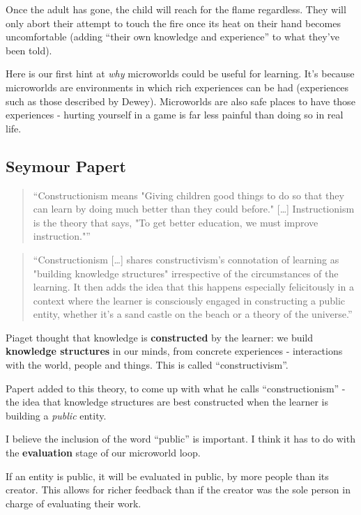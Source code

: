 Once the adult has gone, the child will reach for the flame regardless.
They will only abort their attempt to touch the fire once its heat on
their hand becomes uncomfortable (adding ``their own knowledge and experience'' to what they've been told).

Here is our first hint at \emph{why} microworlds could be useful for
learning. It's because microworlds are environments in which rich
experiences can be had (experiences such as those described by Dewey).
Microworlds are also safe places to have those experiences - hurting
yourself in a game is far less painful than doing so in real life.

\subsection{Seymour Papert}

\begin{quote}
``Constructionism means "Giving children good things to do so that they
can learn by doing much better than they could before." {[}\ldots{}{]}
Instructionism is the theory that says, "To get better education, we
must improve instruction."''\cite{convsinst}
\end{quote}

\begin{quote}
``Constructionism {[}\ldots{}{]} shares constructivism's connotation of
learning as "building knowledge structures" irrespective of the
circumstances of the learning. It then adds the idea that this happens
especially felicitously in a context where the learner is consciously
engaged in constructing a public entity, whether it's a sand castle on
the beach or a theory of the universe.''\cite{sitconst}
\end{quote}

Piaget thought that knowledge is \textbf{constructed} by the learner: we
build \textbf{knowledge structures} in our minds, from concrete
experiences - interactions with the world, people and things. This is called ``constructivism''.

Papert added to this theory, to come up with what he calls
``constructionism'' - the idea that knowledge structures are best
constructed when the learner is building a \emph{public} entity.

I believe the inclusion of the word ``public'' is important. I think it
has to do with the \textbf{evaluation} stage of our microworld loop.

If an entity is public, it will be evaluated in public, by more people
than its creator. This allows for richer feedback than if the creator
was the sole person in charge of evaluating their work.


